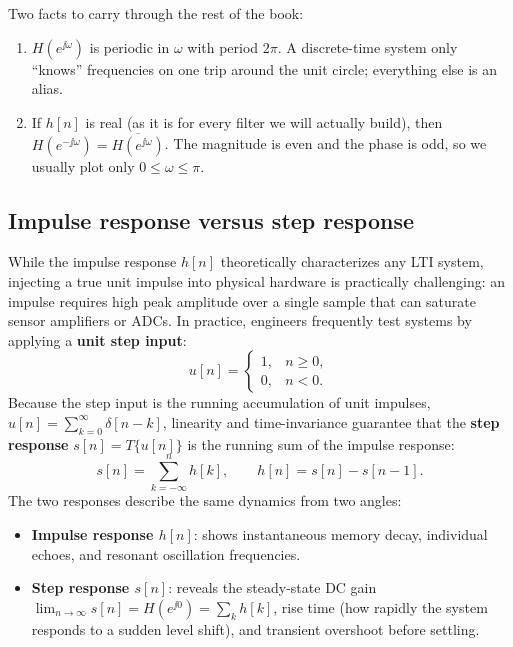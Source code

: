 \begin{focusbox}
Two facts to carry through the rest of the book:
\begin{enumerate}
  \item $H(e^{\jj\omega})$ is periodic in $\omega$ with period $2\pi$. A
  discrete-time system only ``knows'' frequencies on one trip around the unit
  circle; everything else is an alias.
  \item If $h[n]$ is real (as it is for every filter we will actually build),
  then $H(e^{-\jj\omega}) = \overline{H(e^{\jj\omega})}$. The magnitude is even
  and the phase is odd, so we usually plot only $0 \le \omega \le \pi$.
\end{enumerate}
\end{focusbox}

\subsection{Impulse response versus step response}
\label{ch14:step-response}

While the impulse response $h[n]$ theoretically characterizes any LTI system, injecting a true unit impulse into physical hardware is practically challenging: an impulse requires high peak amplitude over a single sample that can saturate sensor amplifiers or ADCs. In practice, engineers frequently test systems by applying a \textbf{unit step input}:
\[
  u[n] = \begin{cases} 1, & n \ge 0, \\ 0, & n < 0. \end{cases}
\]
Because the step input is the running accumulation of unit impulses, $u[n] = \sum_{k=0}^\infty \delta[n-k]$, linearity and time-invariance guarantee that the \textbf{step response} $s[n] = T\{u[n]\}$ is the running sum of the impulse response:
\begin{equation}
  s[n] = \sum_{k=-\infty}^{n} h[k], \qquad h[n] = s[n] - s[n-1].
  \label{ch14:step-impulse-rel}
\end{equation}
The two responses describe the same dynamics from two angles:
\begin{itemize}
  \item \textbf{Impulse response $h[n]$}: shows instantaneous memory decay, individual echoes, and resonant oscillation frequencies.
  \item \textbf{Step response $s[n]$}: reveals the steady-state DC gain $\lim_{n\to\infty} s[n] = H(e^{\jj 0}) = \sum_k h[k]$, rise time (how rapidly the system responds to a sudden level shift), and transient overshoot before settling.
\end{itemize}

